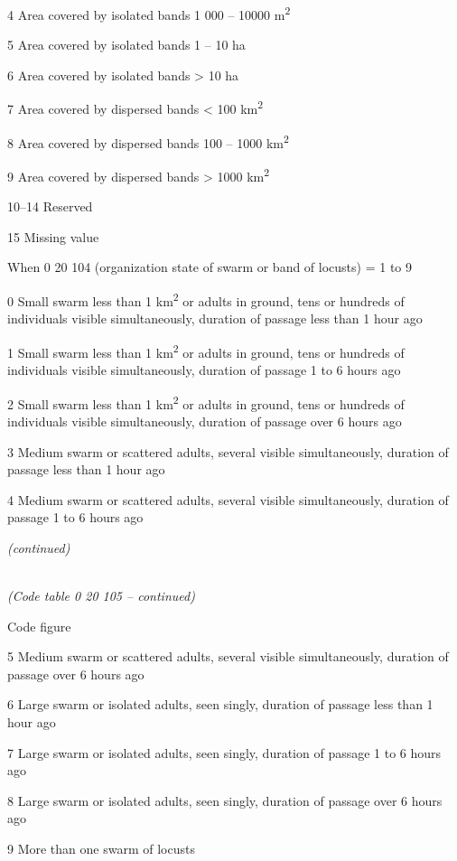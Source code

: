 4 Area covered by isolated bands 1 000 -- 10000 m\textsuperscript{2}

5 Area covered by isolated bands 1 -- 10 ha

6 Area covered by isolated bands \textgreater{} 10 ha

7 Area covered by dispersed bands \textless{} 100 km\textsuperscript{2}

8 Area covered by dispersed bands 100 -- 1000 km\textsuperscript{2}

9 Area covered by dispersed bands \textgreater{} 1000 km\textsuperscript{2}

10--14 Reserved

15 Missing value

When 0 20 104 (organization state of swarm or band of locusts) = 1 to 9

0 Small swarm less than 1 km\textsuperscript{2} or adults in ground, tens or hundreds of individuals visible simultaneously, duration of passage less than 1 hour ago

1 Small swarm less than 1 km\textsuperscript{2} or adults in ground, tens or hundreds of individuals visible simultaneously, duration of passage 1 to 6 hours ago

2 Small swarm less than 1 km\textsuperscript{2} or adults in ground, tens or hundreds of individuals visible simultaneously, duration of passage over 6 hours ago

3 Medium swarm or scattered adults, several visible simultaneously, duration of passage less than 1 hour ago

4 Medium swarm or scattered adults, several visible simultaneously, duration of passage 1 to 6 hours ago

\emph{(continued)}

\emph{\\
(Code table 0 20 105 -- continued)}

Code figure

5 Medium swarm or scattered adults, several visible simultaneously, duration of passage over 6 hours ago

6 Large swarm or isolated adults, seen singly, duration of passage less than 1 hour ago

7 Large swarm or isolated adults, seen singly, duration of passage 1 to 6 hours ago

8 Large swarm or isolated adults, seen singly, duration of passage over 6 hours ago

9 More than one swarm of locusts


